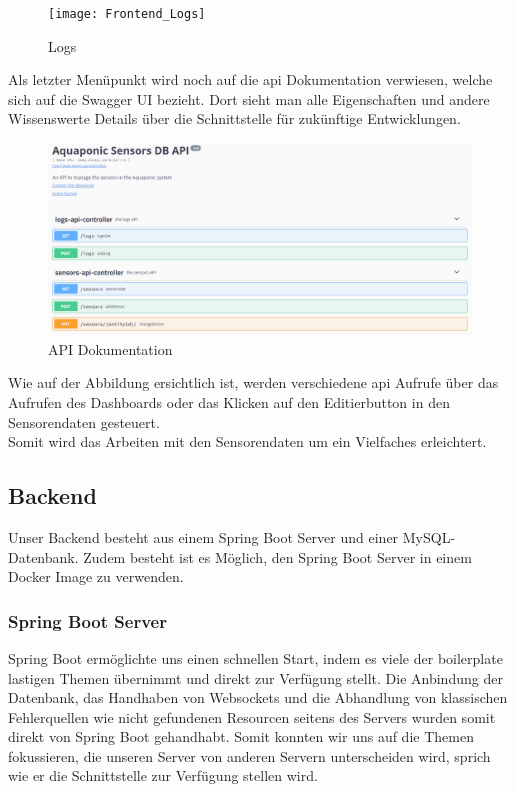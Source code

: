 \documentclass[../main.tex]{subfiles}
\begin{document}
	\begin{figure}[H]
		\centering
		\texttt{[image: Frontend\_Logs]}
		\caption{Logs}
		\label{fig:Frontend_Logs}
	\end{figure}
	\par
	\noindent
	Als letzter Menüpunkt wird noch auf die \gls{api} Dokumentation verwiesen, welche sich auf die Swagger UI bezieht. Dort sieht man alle Eigenschaften und andere Wissenswerte Details über die Schnittstelle für zukünftige Entwicklungen.\par 
	\begin{figure}[H]
		\centering
		\includegraphics[scale=0.4]{../images/API_Documentation}
		\caption{API Dokumentation}
		\label{fig:API_Documentation}
	\end{figure}
	\noindent
	Wie auf der Abbildung ersichtlich ist, werden verschiedene \gls{api} Aufrufe über das Aufrufen des Dashboards oder das Klicken auf den Editierbutton in den Sensorendaten gesteuert. 
	\\
	Somit wird das Arbeiten mit den Sensorendaten um ein Vielfaches erleichtert.
	
	
	\subsection{Backend}
	Unser Backend besteht aus einem Spring Boot Server und einer MySQL-Datenbank. Zudem besteht ist es Möglich, den Spring Boot Server in einem Docker Image zu verwenden.
	
	\subsubsection{Spring Boot Server}
	Spring Boot ermöglichte uns einen schnellen Start, indem es viele der \gls{boilerplate} lastigen Themen übernimmt und direkt zur Verfügung stellt. Die Anbindung der Datenbank, das Handhaben von Websockets und die Abhandlung von klassischen Fehlerquellen wie nicht gefundenen Resourcen seitens des Servers wurden somit direkt von Spring Boot gehandhabt. Somit konnten wir uns auf die Themen fokussieren, die unseren Server von anderen Servern unterscheiden wird, sprich wie er die Schnittstelle zur Verfügung stellen wird.
	
\end{document}
